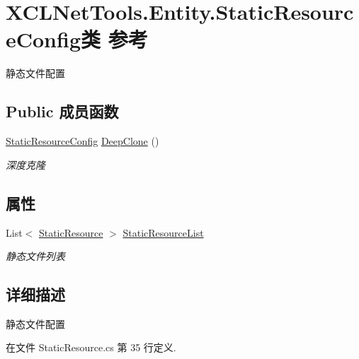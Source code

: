 \hypertarget{class_x_c_l_net_tools_1_1_entity_1_1_static_resource_config}{\section{X\-C\-L\-Net\-Tools.\-Entity.\-Static\-Resource\-Config类 参考}
\label{class_x_c_l_net_tools_1_1_entity_1_1_static_resource_config}
}


静态文件配置  


\subsection*{Public 成员函数}
\begin{DoxyCompactItemize}
\item 
\hyperlink{class_x_c_l_net_tools_1_1_entity_1_1_static_resource_config}{Static\-Resource\-Config} \hyperlink{class_x_c_l_net_tools_1_1_entity_1_1_static_resource_config_a488ef1a24b5a4be8cdfc93610cc8bb31}{Deep\-Clone} ()
\begin{DoxyCompactList}\small\item\em 深度克隆 \end{DoxyCompactList}\end{DoxyCompactItemize}
\subsection*{属性}
\begin{DoxyCompactItemize}
\item 
List$<$ \hyperlink{class_x_c_l_net_tools_1_1_entity_1_1_static_resource}{Static\-Resource} $>$ \hyperlink{class_x_c_l_net_tools_1_1_entity_1_1_static_resource_config_a4525e28db253a1da329b5ebd1982f04d}{Static\-Resource\-List}
\begin{DoxyCompactList}\small\item\em 静态文件列表 \end{DoxyCompactList}\end{DoxyCompactItemize}


\subsection{详细描述}
静态文件配置 



在文件 Static\-Resource.\-cs 第 35 行定义.



